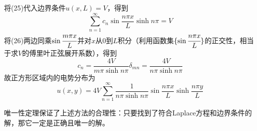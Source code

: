 \documentclass[a4paper,10pt]{ctexart}
\begin{document}
将(25)代入边界条件$u(x,L) =V$，得到
\begin{equation}
\sum_{n=1}^\infty c_n \sin \frac{n\pi x}{L} \sinh n\pi = V
\end{equation}
将(26)两边同乘$\sin \cfrac{m\pi x}{L}$并对$x$从0到$L$积分（利用函数集$\{ \sin \cfrac{n \pi x}{L}\}$的正交性，相当于求$V$的傅里叶正弦展开系数），得到
\begin{equation}
c_n = \frac{4V}{m\pi \sinh n \pi} \delta_{mn} = \frac{4V}{n\pi \sinh n \pi}
\end{equation}
故正方形区域内的电势分布为
\begin{equation}
u(x,y) = 4V\sum_{n=1}^{\infty} \frac{1}{n\pi \sinh n \pi}  \sin \frac{n\pi x}{L} \sinh \frac{n\pi y}{L}
\end{equation}
\par
唯一性定理保证了上述方法的合理性：只要找到了符合Laplace方程和边界条件的解，那它一定是正确且唯一的解。
\end{document}

